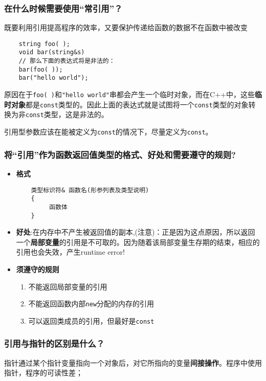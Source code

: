 \documentclass[UTF8,a4paper,8pt]{ctexart}
\begin{document}
		\subsubsection{在什么时候需要使用“常引用”？}
			既要利用引用提高程序的效率，又要保护传递给函数的数据不在函数中被改变
			
			\begin{lstlisting}
	string foo( );
	void bar(string&s)
	// 那么下面的表达式将是非法的：
	bar(foo( ));
	bar("hello world");
			\end{lstlisting}
			
			原因在于\verb|foo( )|和\verb|"hello world"|串都会产生一个临时对象，而在C++中，这些\textbf{临时对象}都是\verb|const|类型的。因此上面的表达式就是试图将一个\verb|const|类型的对象转换为非\verb|const|类型，这是非法的。
			
			引用型参数应该在能被定义为\verb|const|的情况下，尽量定义为\verb|const|。
		\subsubsection{将“引用”作为函数返回值类型的格式、好处和需要遵守的规则?}
			\begin{itemize}[itemindent = 1em]
				\item \textbf{格式}
					\begin{lstlisting}
	类型标识符& 函数名(形参列表及类型说明)
	{ 
		 函数体
	}
					\end{lstlisting}
				\item \textbf{好处}:在内存中不产生被返回值的副本,(注意)：正是因为这点原因，所以返回一个\textbf{局部变量}的引用是不可取的。因为随着该局部变量生存期的结束，相应的引用也会失效，产生runtime error!
				
				\item \textbf{须遵守的规则}
					\begin{enumerate}
						\item 不能返回局部变量的引用
						\item 不能返回函数内部\verb|new|分配的内存的引用
						\item 可以返回类成员的引用，但最好是\verb|const|
					\end{enumerate}
			\end{itemize}		
		
		\subsubsection{引用与指针的区别是什么？}
			 指针通过某个指针变量指向一个对象后，对它所指向的变量\textbf{间接操作}。程序中使用指针，程序的可读性差；
			
\end{document}
